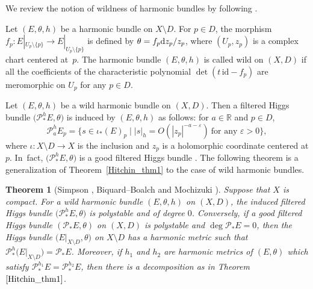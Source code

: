 \documentclass[10pt,a4paper]{amsart}
\numberwithin{equation}{section}
\newtheorem{Theorem}{Theorem}[section]
\newcommand{\R}{\mathbb{R}}
\newcommand{\id}{\mathrm{id}}
\begin{document}
We review the notion of wildness of harmonic bundles by following \cite{Mo1}.
\begin{Definition}
 Let $(E,\theta,h)$ be a harmonic bundle on $X\setminus D$. For $p\in D$, the morphism $f_p\colon E|_{U_p\setminus\{p\}}\to E|_{U_p \setminus\{p\}}$ is defined by $\theta = f_p {\rm d}z_p/z_p$, where $(U_p,z_p)$ is a complex chart centered at~$p$. The harmonic bundle $(E,\theta,h)$ is called wild on $(X,D)$ if all the coefficients of the characteristic polynomial $\det(t\,\id- f_p)$ are meromorphic on $U_p$ for any $p\in D$.
\end{Definition}
Let $(E,\theta,h)$ be a wild harmonic bundle on $(X,D)$. Then a filtered Higgs bundle $\bigl(\mathcal{P}_{*}^{h} E,\theta\bigr)$ is induced by $(E,\theta,h)$ as follows: for $a\in\R$ and $p\in D$,
\begin{equation}\label{induced_wild_harmonic_bundle}
 \mathcal{P}_{a}^{h} E_p = \{s\in \iota_{*}(E)_p \mid |s|_h = O(|z_p|^{-a-\varepsilon})\ \text{for any $\varepsilon>0$} \},
\end{equation}
where $\iota\colon X\setminus D\to X$ is the inclusion and $z_p$ is a holomorphic coordinate centered at $p$. In~fact, $\bigl(\mathcal{P}_{*}^{h} E,\theta\bigr)$ is a good filtered Higgs bundle \cite{Mo1}. The following theorem is a generalization of Theorem~\ref{Hitchin_thm1} to the case of wild harmonic bundles.
\begin{Theorem}[Simpson \cite{Si2}, Biquard--Boalch \cite{BB} and Mochizuki \cite{Mo1}]\label{Hitchin_thm2}
 Suppose that $X$ is compact. For a wild harmonic bundle $(E,\theta,h)$ on $(X,D)$, the induced filtered Higgs bundle $\bigl(\mathcal{P}_{*}^{h} E,\theta\bigr)$ is polystable and of degree $0$. Conversely, if a good filtered Higgs bundle $(\mathcal{P}_{*} E,\theta)$ on $(X,D)$ is polystable and $\deg{\mathcal{P}_{*}E}=0$, then the Higgs bundle $\bigl(E|_{X\setminus D},\theta\bigr)$ on $X\setminus D$ has a harmonic metric such that $\mathcal{P}_{*}^h \bigl(E|_{X\setminus D}\bigr) =\mathcal{P}_{*}E $. Moreover, if $h_1$ and $h_2$ are harmonic metrics of $(E,\theta)$ which satisfy $\mathcal{P}_{*}^{h_1} E = \mathcal{P}_{*}^{h_2} E$, then there is a decomposition as in Theorem $\ref{Hitchin_thm1}$.
\end{Theorem}
\end{document}
